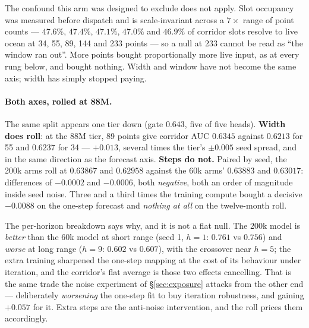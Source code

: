\documentclass[10pt]{article}
\begin{document}
The confound this arm was designed to exclude does not apply. Slot
occupancy was measured before dispatch and is scale-invariant across a
$7\times$ range of point counts --- $47.6\%$, $47.4\%$, $47.1\%$,
$47.0\%$ and $46.9\%$ of corridor slots resolve to live ocean at 34, 55,
89, 144 and 233 points --- so a null at 233 cannot be read as ``the
window ran out''. More points bought proportionally more live input, as
at every rung below, and bought nothing. Width and window have not
become the same axis; width has simply stopped paying.

\paragraph{Both axes, rolled at 88M.} The same split appears one tier
down (gate $0.643$, five of five heads). \textbf{Width does roll}: at
the 88M tier, 89 points give corridor AUC $0.6345$ against $0.6213$ for
55 and $0.6237$ for 34 --- $+0.013$, several times the tier's
$\pm0.005$ seed spread, and in the same direction as the forecast axis.
\textbf{Steps do not.} Paired by seed, the 200k arms roll at $0.63867$
and $0.62958$ against the 60k arms' $0.63883$ and $0.63017$: differences
of $-0.0002$ and $-0.0006$, both \emph{negative}, both an order of
magnitude inside seed noise. Three and a third times the training
compute bought a decisive $-0.0088$ on the one-step forecast and
\emph{nothing at all} on the twelve-month roll.

The per-horizon breakdown says why, and it is not a flat null. The 200k
model is \emph{better} than the 60k model at short range (seed 1,
$h{=}1$: $0.761$ vs $0.756$) and \emph{worse} at long range ($h{=}9$:
$0.602$ vs $0.607$), with the crossover near $h{=}5$; the extra
training sharpened the one-step mapping at the cost of its behaviour
under iteration, and the corridor's flat average is those two effects
cancelling. That is the same trade the noise experiment of
\S\ref{sec:exposure} attacks from the other end --- deliberately
\emph{worsening} the one-step fit to buy iteration robustness, and
gaining $+0.057$ for it. Extra steps are the anti-noise intervention,
and the roll prices them accordingly.
\end{document}
